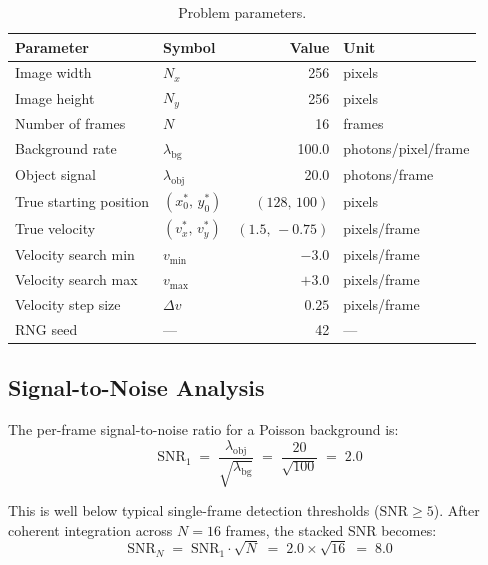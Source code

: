 \documentclass[11pt,letterpaper]{article}
\begin{document}
\begin{table}[h]
\centering
\caption{Problem parameters.}
\label{tab:params}
\begin{tabular}{@{}llrl@{}}
\toprule
\textbf{Parameter} & \textbf{Symbol} & \textbf{Value} & \textbf{Unit} \\
\midrule
Image width  & $N_x$                 & 256   & pixels \\
Image height & $N_y$                 & 256   & pixels \\
Number of frames & $N$               & 16    & frames \\
Background rate  & $\lambda_{\mathrm{bg}}$ & 100.0 & photons/pixel/frame \\
Object signal    & $\lambda_{\mathrm{obj}}$& 20.0  & photons/frame \\
\midrule
True starting position & $(x_0^*,\, y_0^*)$    & $(128,\, 100)$ & pixels \\
True velocity          & $(v_x^*,\, v_y^*)$    & $(1.5,\, {-}0.75)$ & pixels/frame \\
\midrule
Velocity search min    & $v_{\min}$     & $-3.0$  & pixels/frame \\
Velocity search max    & $v_{\max}$     & $+3.0$  & pixels/frame \\
Velocity step size     & $\Delta v$     & $0.25$  & pixels/frame \\
\midrule
RNG seed               & ---            & 42     & --- \\
\bottomrule
\end{tabular}
\end{table}

\subsection{Signal-to-Noise Analysis}

The per-frame signal-to-noise ratio for a Poisson background is:
\begin{equation}
    \mathrm{SNR}_1
    \;=\; \frac{\lambda_{\mathrm{obj}}}{\sqrt{\lambda_{\mathrm{bg}}}}
    \;=\; \frac{20}{\sqrt{100}}
    \;=\; 2.0
\end{equation}

This is well below typical single-frame detection thresholds
($\mathrm{SNR} \geq 5$). After coherent integration across $N = 16$ frames,
the stacked SNR becomes:
\begin{equation}
    \mathrm{SNR}_N
    \;=\; \mathrm{SNR}_1 \cdot \sqrt{N}
    \;=\; 2.0 \times \sqrt{16}
    \;=\; 8.0
\end{equation}
\end{document}
